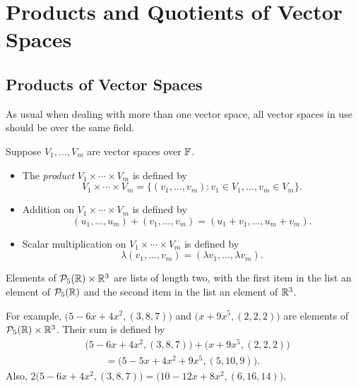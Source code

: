 \iftestbuild %
\setcounter{section}{4}\setcounter{theorem}{86}
\fi %
\section{Products and Quotients of Vector Spaces}

\subsection{Products of Vector Spaces}

As usual when dealing with more than one vector space, all vector spaces in use
should be over the same field.

\begin{definition}\label{ax:3.87}\leavevmode
Suppose $V_1,\dots,V_m$ are vector spaces over $\mathbb{F}$.
\begin{itemize}
\item The \emph{product} $V_1\times\cdots\times V_m$ is defined by
  \[ V_1\times\cdots\times V_m
     = \{(v_1,\dots,v_m) : v_1\in V_1,\dots,v_m\in V_m\}. \]
\item Addition on $V_1\times\cdots\times V_m$ is defined by
  \[ (u_1,\dots,u_m)+(v_1,\dots,v_m) = (u_1+v_1,\dots,u_m+v_m). \]
\item Scalar multiplication on $V_1\times\cdots\times V_m$ is defined by
  \[ \lambda(v_1,\dots,v_m) = (\lambda v_1,\dots,\lambda v_m). \]
\end{itemize}
\end{definition}

\begin{example}\label{ax:3.88}
Elements of $\mathcal{P}_5(\mathbb{R})\times\mathbb{R}^3$ are lists of length two, with the first item
in the list an element of $\mathcal{P}_5(\mathbb{R})$ and the second item in the list an
element of $\mathbb{R}^3$.

For example, $\bigl(5-6x+4x^2,(3,8,7)\bigr)$ and $\bigl(x+9x^5,(2,2,2)\bigr)$
are elements of $\mathcal{P}_5(\mathbb{R})\times\mathbb{R}^3$. Their sum is defined by
\begin{align*}
&\bigl(5-6x+4x^2,(3,8,7)\bigr)+\bigl(x+9x^5,(2,2,2)\bigr)\\
&\qquad= \bigl(5-5x+4x^2+9x^5,(5,10,9)\bigr).
\end{align*}
Also, $2\bigl(5-6x+4x^2,(3,8,7)\bigr)=\bigl(10-12x+8x^2,(6,16,14)\bigr)$.
\end{example}


